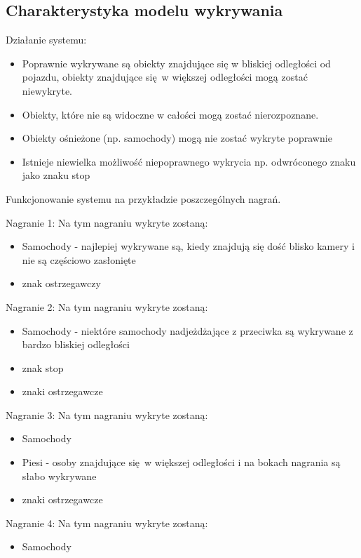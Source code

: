 \subsection{Charakterystyka modelu wykrywania}
Działanie systemu:
\begin{itemize}
	\item Poprawnie wykrywane są obiekty znajdujące się w bliskiej odległości od pojazdu, obiekty znajdujące się w większej odległości mogą zostać niewykryte.
	\item Obiekty, które nie są widoczne w całości mogą zostać nierozpoznane.
	\item Obiekty ośnieżone (np. samochody) mogą nie zostać wykryte poprawnie
	\item Istnieje niewielka możliwość niepoprawnego wykrycia np. odwróconego znaku jako znaku stop
\end{itemize}

Funkcjonowanie systemu na przykładzie poszczególnych nagrań.
\newline

Nagranie 1: \newline
Na tym nagraniu wykryte zostaną:
\begin{itemize}
	\item Samochody - najlepiej wykrywane są, kiedy znajdują się dość blisko kamery i nie są częściowo zasłonięte
	\item znak ostrzegawczy
\end{itemize}

Nagranie 2: \newline
Na tym nagraniu wykryte zostaną:
\begin{itemize}
	\item Samochody - niektóre samochody nadjeżdżające z przeciwka są wykrywane z bardzo bliskiej odległości
	\item znak stop
	\item znaki ostrzegawcze
\end{itemize}


Nagranie 3: \newline
Na tym nagraniu wykryte zostaną:
\begin{itemize}
	\item Samochody
	\item Piesi - osoby znajdujące się w większej odległości i na bokach nagrania są słabo wykrywane
	\item znaki ostrzegawcze
\end{itemize}

Nagranie 4: \newline
Na tym nagraniu wykryte zostaną:
\begin{itemize}
	\item Samochody
\end{itemize}


